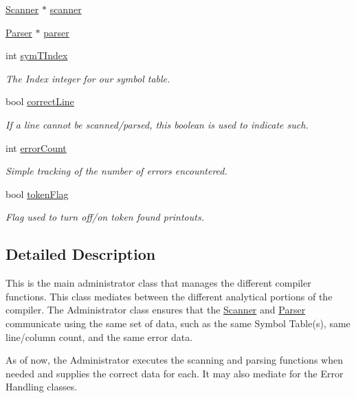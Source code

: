 \begin{DoxyCompactItemize}
\hyperlink{classScanner}{Scanner} $\ast$ \hyperlink{classAdmin_a6846c5ec5e565001a18a20167ff7b3cf}{scanner}
\item 
\hyperlink{classParser}{Parser} $\ast$ \hyperlink{classAdmin_a0fe59c6a08ae239bee02a58180fef8c3}{parser}
\item 
int \hyperlink{classAdmin_ae1c48226f950c3e470785785aff4d536}{symTIndex}
\begin{DoxyCompactList}\small\item\em The Index integer for our symbol table. \item\end{DoxyCompactList}\item 
bool \hyperlink{classAdmin_a18dd34f91c28721e9ba9ec9370ae5f98}{correctLine}
\begin{DoxyCompactList}\small\item\em If a line cannot be scanned/parsed, this boolean is used to indicate such. \item\end{DoxyCompactList}\item 
int \hyperlink{classAdmin_ae29edcd0464b203b35f72caba6af7295}{errorCount}
\begin{DoxyCompactList}\small\item\em Simple tracking of the number of errors encountered. \item\end{DoxyCompactList}\item 
bool \hyperlink{classAdmin_a7160b27f8f1cf8d4e526cc6e54ee8031}{tokenFlag}
\begin{DoxyCompactList}\small\item\em Flag used to turn off/on token found printouts. \item\end{DoxyCompactList}\end{DoxyCompactItemize}


\subsection{Detailed Description}
This is the main administrator class that manages the different compiler functions. This class mediates between the different analytical portions of the compiler. The Administrator class ensures that the \hyperlink{classScanner}{Scanner} and \hyperlink{classParser}{Parser} communicate using the same set of data, such as the same Symbol Table(s), same line/column count, and the same error data.

As of now, the Administrator executes the scanning and parsing functions when needed and supplies the correct data for each. It may also mediate for the Error Handling classes. 


